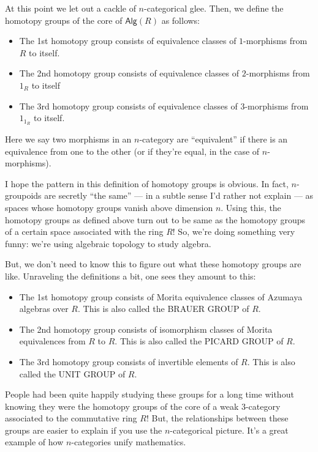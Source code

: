 \documentclass{article}
\def\tightlist{}
\begin{document}
At this point we let out a cackle of \(n\)-categorical glee. Then, we
define the homotopy groups of the core of \(\mathsf{Alg}(R)\) as
follows:

\begin{itemize}
\tightlist
\item
  The 1st homotopy group consists of equivalence classes of
  \(1\)-morphisms from \(R\) to itself.
\item
  The 2nd homotopy group consists of equivalence classes of
  \(2\)-morphisms from \(1_R\) to itself
\item
  The 3rd homotopy group consists of equivalence classes of
  \(3\)-morphisms from \(1_{1_R}\) to itself.
\end{itemize}

Here we say two morphisms in an \(n\)-category are ``equivalent'' if
there is an equivalence from one to the other (or if they're equal, in
the case of \(n\)-morphisms).

I hope the pattern in this definition of homotopy groups is obvious. In
fact, \(n\)-groupoids are secretly ``the same'' --- in a subtle sense
I'd rather not explain --- as spaces whose homotopy groups vanish above
dimension \(n\). Using this, the homotopy groups as defined above turn
out to be same as the homotopy groups of a certain space associated with
the ring \(R\)! So, we're doing something very funny: we're using
algebraic topology to study algebra.

But, we don't need to know this to figure out what these homotopy groups
are like. Unraveling the definitions a bit, one sees they amount to
this:

\begin{itemize}
\tightlist
\item
  The 1st homotopy group consists of Morita equivalence classes of
  Azumaya algebras over \(R\). This is also called the BRAUER GROUP of
  \(R\).
\item
  The 2nd homotopy group consists of isomorphism classes of Morita
  equivalences from \(R\) to \(R\). This is also called the PICARD GROUP
  of \(R\).
\item
  The 3rd homotopy group consists of invertible elements of \(R\). This
  is also called the UNIT GROUP of \(R\).
\end{itemize}

People had been quite happily studying these groups for a long time
without knowing they were the homotopy groups of the core of a weak
\(3\)-category associated to the commutative ring \(R\)! But, the
relationships between these groups are easier to explain if you use the
\(n\)-categorical picture. It's a great example of how \(n\)-categories
unify mathematics.
\end{document}
